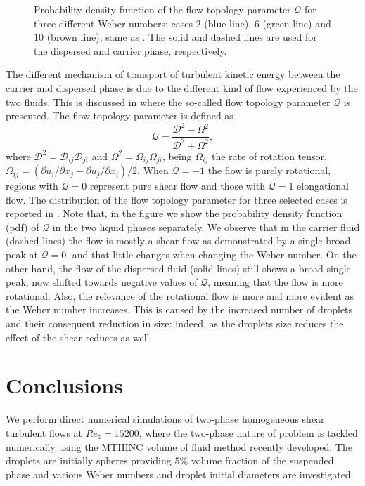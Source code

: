 \begin{figure}
	\centering
	 \vspace{0.5cm}
	\caption{Probability density function of the flow topology parameter $\mathcal{Q}$ for three different Weber numbers: cases $2$ (blue line), $6$ (green line) and $10$ (brown line), same as . The solid and dashed lines are used for the dispersed and carrier phase, respectively.}
	\label{fig:flowtop}
\end{figure}
The different mechanism of transport of turbulent kinetic energy between the carrier and dispersed phase is due to the different kind of flow experienced by the two fluids. This is discussed in  where the so-called flow topology parameter $\mathcal{Q}$ \citep[see e.g.][]{de-vita_rosti_izbassarov_duffo_tammisola_hormozi_brandt_2018a} is presented. The flow topology parameter is defined as
\begin{equation}
\label{eq:flowtop}
\mathcal{Q} = \frac{\mathcal{D}^2 - \Omega ^2}{\mathcal{D}^2 + \Omega^2},
\end{equation}
where $\mathcal{D}^2 = \mathcal{D}_{ij}\mathcal{D}_{ji}$ and $\Omega^2 = \Omega_{ij}\Omega_{ji}$, being $\Omega_{ij}$ the rate of rotation tensor, $\Omega_{ij} = (\partial u_i/\partial x_j - \partial u_j/\partial x_i)/2$. When $\mathcal{Q} = -1$ the flow is purely rotational, regions with $\mathcal{Q} = 0$ represent pure shear flow and those with $\mathcal{Q} = 1$ elongational flow. The distribution of the flow topology parameter for three selected cases is reported in . Note that, in the figure we show the probability density function (pdf) of $\mathcal{Q}$ in the two liquid phases separately. We observe that in the carrier fluid (dashed lines) the flow is mostly a shear flow as demonstrated by a single broad peak at $\mathcal{Q} = 0$, and that little changes when changing the Weber number. On the other hand, the flow of the dispersed fluid (solid lines) still shows a broad single peak, now shifted towards negative values of $\mathcal{Q}$, meaning that the flow is more rotational. Also, the relevance of the rotational flow is more and more evident as the Weber number increases. This is caused by the increased number of droplets and their consequent reduction in size: indeed, as the droplets size reduces the effect of the shear reduces as well.

\section{Conclusions} \label{sec:conclusion}
We perform direct numerical simulations of two-phase homogeneous shear turbulent flows at $Re_z = 15200$, where the two-phase nature of problem is tackled numerically using the MTHINC volume of fluid method recently developed. The droplets are initially spheres providing $5\%$ volume fraction of the suspended phase and various Weber numbers and droplet initial diameters are investigated.

